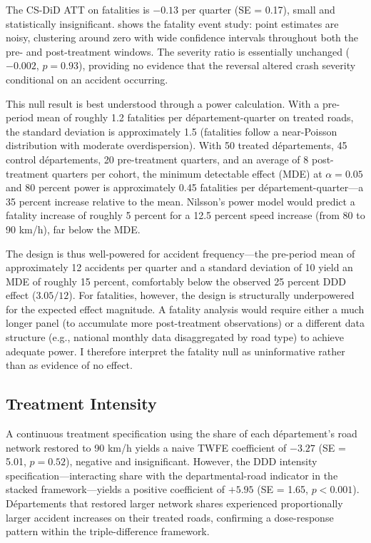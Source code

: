 \documentclass[12pt]{article}
\begin{document}
The CS-DiD ATT on fatalities is $-0.13$ per quarter (SE = 0.17), small and statistically insignificant.  shows the fatality event study: point estimates are noisy, clustering around zero with wide confidence intervals throughout both the pre- and post-treatment windows. The severity ratio is essentially unchanged ($-0.002$, $p = 0.93$), providing no evidence that the reversal altered crash severity conditional on an accident occurring.

This null result is best understood through a power calculation. With a pre-period mean of roughly 1.2 fatalities per d\'{e}partement-quarter on treated roads, the standard deviation is approximately 1.5 (fatalities follow a near-Poisson distribution with moderate overdispersion). With 50 treated d\'{e}partements, 45 control d\'{e}partements, 20 pre-treatment quarters, and an average of 8 post-treatment quarters per cohort, the minimum detectable effect (MDE) at $\alpha = 0.05$ and 80 percent power is approximately 0.45 fatalities per d\'{e}partement-quarter---a 35 percent increase relative to the mean. Nilsson's power model would predict a fatality increase of roughly 5 percent for a 12.5 percent speed increase (from 80 to 90 km/h), far below the MDE.

The design is thus well-powered for accident frequency---the pre-period mean of approximately 12 accidents per quarter and a standard deviation of 10 yield an MDE of roughly 15 percent, comfortably below the observed 25 percent DDD effect ($3.05/12$). For fatalities, however, the design is structurally underpowered for the expected effect magnitude. A fatality analysis would require either a much longer panel (to accumulate more post-treatment observations) or a different data structure (e.g., national monthly data disaggregated by road type) to achieve adequate power. I therefore interpret the fatality null as uninformative rather than as evidence of no effect.

\subsection{Treatment Intensity}

A continuous treatment specification using the share of each d\'{e}partement's road network restored to 90 km/h yields a naive TWFE coefficient of $-3.27$ (SE = 5.01, $p = 0.52$), negative and insignificant. However, the DDD intensity specification---interacting share with the departmental-road indicator in the stacked framework---yields a positive coefficient of $+5.95$ (SE = 1.65, $p < 0.001$). D\'{e}partements that restored larger network shares experienced proportionally larger accident increases on their treated roads, confirming a dose-response pattern within the triple-difference framework.
\end{document}

